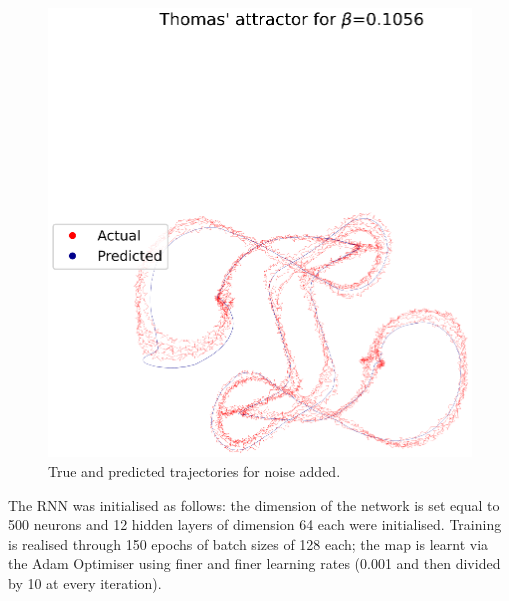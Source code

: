 \documentclass[a4paper,12pt,twoside]{report}
\begin{document}
\begin{figure}[ht]
    \includegraphics[width=\linewidth]{ThomasNoisy.eps}
    \caption*{True and predicted trajectories for noise added.}
  \endminipage
\end{figure}

The RNN was initialised as follows: the dimension of the network is set equal to 500 neurons and 12 hidden layers of dimension 64 each were initialised. Training is realised through 150 epochs of batch sizes of 128 each; the map is learnt via the Adam Optimiser using finer and finer learning rates (0.001 and then divided by 10 at every iteration).
\end{document}
